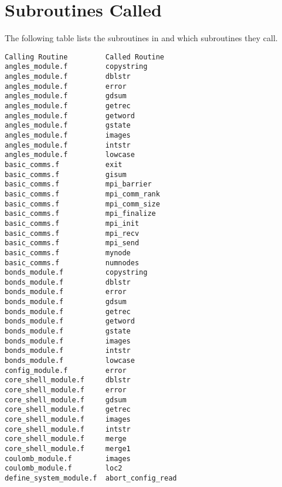 \section*{Subroutines Called}

The following table lists the subroutines in \D{} 
and which subroutines they call.

\begin{verbatim}
Calling Routine         Called Routine
angles_module.f         copystring                
angles_module.f         dblstr                    
angles_module.f         error                     
angles_module.f         gdsum                     
angles_module.f         getrec                    
angles_module.f         getword                   
angles_module.f         gstate                    
angles_module.f         images                    
angles_module.f         intstr                    
angles_module.f         lowcase                   
basic_comms.f           exit                      
basic_comms.f           gisum                     
basic_comms.f           mpi_barrier               
basic_comms.f           mpi_comm_rank             
basic_comms.f           mpi_comm_size             
basic_comms.f           mpi_finalize              
basic_comms.f           mpi_init                  
basic_comms.f           mpi_recv                  
basic_comms.f           mpi_send                  
basic_comms.f           mynode                    
basic_comms.f           numnodes                  
bonds_module.f          copystring                
bonds_module.f          dblstr                    
bonds_module.f          error                     
bonds_module.f          gdsum                     
bonds_module.f          getrec                    
bonds_module.f          getword                   
bonds_module.f          gstate                    
bonds_module.f          images                    
bonds_module.f          intstr                    
bonds_module.f          lowcase                   
config_module.f         error                     
core_shell_module.f     dblstr                    
core_shell_module.f     error                     
core_shell_module.f     gdsum                     
core_shell_module.f     getrec                    
core_shell_module.f     images                    
core_shell_module.f     intstr                    
core_shell_module.f     merge                     
core_shell_module.f     merge1                    
coulomb_module.f        images                    
coulomb_module.f        loc2                      
define_system_module.f  abort_config_read         

\end{verbatim}
